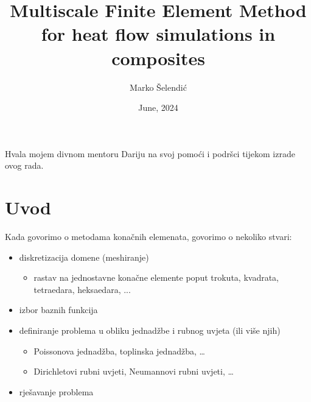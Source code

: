 \documentclass[zavrsnirad]{fer}
\title{Multiscale Finite Element Method for heat flow simulations in composites}
\author{Marko Šelendić}
\date{June, 2024}
\begin{document}






\begin{zahvale}
  Hvala mojem divnom mentoru Dariju na svoj pomoći i podršci tijekom izrade ovog rada.
\end{zahvale}


\mainmatter


\tableofcontents


\chapter{Uvod}\label{pog:uvod}

Kada govorimo o metodama konačnih elemenata, govorimo o nekoliko stvari:
\begin{itemize}
  \item diskretizacija domene (meshiranje)
  \begin{itemize}
    \item rastav na jednostavne konačne elemente poput trokuta, kvadrata, tetraedara, heksaedara, ...
  \end{itemize}
  \item izbor baznih funkcija
  \item definiranje problema u obliku jednadžbe i rubnog uvjeta (ili više njih)
  \begin{itemize}
    \item Poissonova jednadžba, toplinska jednadžba, \ldots
    \item Dirichletovi rubni uvjeti, Neumannovi rubni uvjeti, \ldots
  \end{itemize}
  \item rješavanje problema
\end{itemize}
\end{document}
